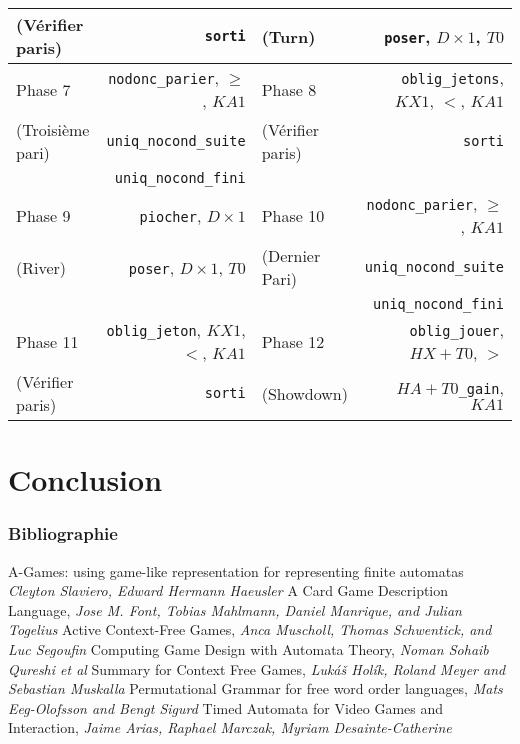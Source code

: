 \documentclass{beamercours}
\begin{document}
\begin{frame}
{\begin{table}
{\begin{tabular}{lr|lr}
                (Vérifier paris) & \texttt{sorti} & (Turn) & \texttt{poser}, $D\times 1$, $T0$\\
                \midrule
                Phase 7 & \texttt{nodonc\_parier}, $\geq$, $KA1$ & Phase 8 & \texttt{oblig\_jetons}, $KX1$, $<$, $KA1$\\
                (Troisième pari) & \texttt{uniq\_nocond\_suite} & (Vérifier paris) & \texttt{sorti}\\
                & \texttt{uniq\_nocond\_fini}\\
                \midrule
                Phase 9 & \texttt{piocher}, $D \times 1$ & Phase 10 & \texttt{nodonc\_parier}, $\geq$, $KA1$\\
                (River) & \texttt{poser}, $D\times 1$, $T0$ & (Dernier Pari) & \texttt{uniq\_nocond\_suite}\\
                & & & \texttt{uniq\_nocond\_fini}\\
                \midrule
                Phase 11 & \texttt{oblig\_jeton}, $KX1$, $<$, $KA1$ & Phase 12 & \texttt{oblig\_jouer}, $HX + T0$, $>$\\
                (Vérifier paris) & \texttt{sorti} & (Showdown) & $HA + T0$\texttt{\_gain}, $KA1$\\
                \bottomrule
            \end{tabular}}
        \end{table}
    }

\end{frame}

\section*{Conclusion}

\begin{frame}
    \frametitle{Bibliographie}

    \begin{thebibliography}{7}
        \scriptsize
         A-Games: using game-like representation for representing finite automatas \textit{Cleyton Slaviero, Edward Hermann Haeusler}
         A Card Game Description Language, \textit{Jose M. Font, Tobias Mahlmann, Daniel Manrique, and Julian Togelius}
         Active Context-Free Games, \textit{Anca Muscholl, Thomas Schwentick, and Luc Segoufin}
         Computing Game Design with Automata Theory, \textit{Noman Sohaib Qureshi et al}
         Summary for Context Free Games, \textit{Lukáš Holík, Roland Meyer and Sebastian Muskalla}
         Permutational Grammar for free word order languages, \textit{Mats Eeg-Olofsson and Bengt Sigurd}
         Timed Automata for Video Games and Interaction, \textit{Jaime Arias, Raphael Marczak, Myriam Desainte-Catherine}
    \end{thebibliography}


\end{frame}
\end{document}
